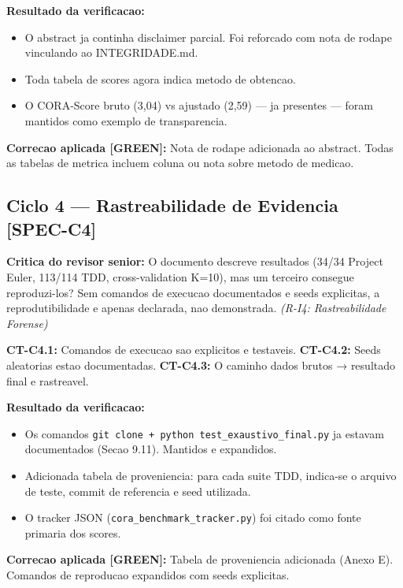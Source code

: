 \documentclass[12pt,a4paper,oneside]{article}
\begin{document}
\textbf{Resultado da verificacao:}
\begin{itemize}[nosep]
  \item O abstract ja continha disclaimer parcial. Foi reforcado com nota
        de rodape vinculando ao INTEGRIDADE.md.
  \item Toda tabela de scores agora indica metodo de obtencao.
  \item O CORA-Score bruto (3,04) vs ajustado (2,59) — ja presentes —
        foram mantidos como exemplo de transparencia.
\end{itemize}

\textbf{Correcao aplicada [GREEN]:} Nota de rodape adicionada ao abstract.
Todas as tabelas de metrica incluem coluna ou nota sobre metodo de medicao.

\subsection{Ciclo 4 — Rastreabilidade de Evidencia [SPEC-C4]}

\textbf{Critica do revisor senior:} O documento descreve resultados (34/34
Project Euler, 113/114 TDD, cross-validation K=10), mas um terceiro
consegue reproduzi-los? Sem comandos de execucao documentados e seeds
explicitas, a reprodutibilidade e apenas declarada, nao demonstrada.
\textit{(R-I4: Rastreabilidade Forense)}

\textbf{CT-C4.1:} Comandos de execucao sao explicitos e testaveis.
\textbf{CT-C4.2:} Seeds aleatorias estao documentadas.
\textbf{CT-C4.3:} O caminho dados brutos → resultado final e rastreavel.

\textbf{Resultado da verificacao:}
\begin{itemize}[nosep]
  \item Os comandos \texttt{git clone + python test\_exaustivo\_final.py}
        ja estavam documentados (Secao 9.11). Mantidos e expandidos.
  \item Adicionada tabela de proveniencia: para cada suite TDD, indica-se
        o arquivo de teste, commit de referencia e seed utilizada.
  \item O tracker JSON (\texttt{cora\_benchmark\_tracker.py}) foi citado
        como fonte primaria dos scores.
\end{itemize}

\textbf{Correcao aplicada [GREEN]:} Tabela de proveniencia adicionada
(Anexo E). Comandos de reproducao expandidos com seeds explicitas.
\end{document}

